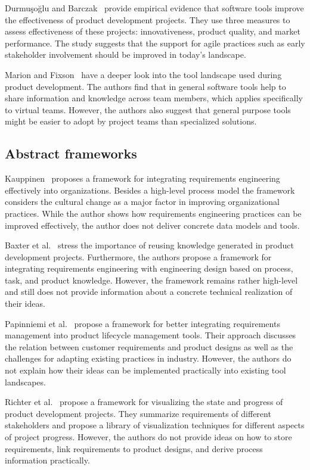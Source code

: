     Durmuşoğlu and Barczak~\cite{DURMUSOGLU2011321} provide empirical evidence that software tools improve the effectiveness of product development projects.
    They use three measures to assess effectiveness of these projects: innovativeness, product quality, and market performance.
    The study suggests that the support for agile practices such as early stakeholder involvement should be improved in today's landscape.
    
    Marion and Fixson~\cite{marion_fixson_2019} have a deeper look into the tool landscape used during product development.
    The authors find that in general software tools help to share information and knowledge across team members, which applies specifically to virtual teams.
    However, the authors also suggest that general purpose tools might be easier to adopt by project teams than specialized solutions.
    
    \subsection*{Abstract frameworks}
    Kauppinen~\cite{Kauppinen2005} proposes a framework for integrating requirements engineering effectively into organizations.
    Besides a high-level process model the framework considers the cultural change as a major factor in improving organizational practices.
    While the author shows how requirements engineering practices can be improved effectively, the author does not deliver concrete data models and tools.
    
    Baxter et al.~\cite{BAXTER2008585} stress the importance of reusing knowledge generated in product development projects.
    Furthermore, the authors propose a framework for integrating requirements engineering with engineering design based on process, task, and product knowledge.
    However, the framework remains rather high-level and still does not provide information about a concrete technical realization of their ideas.

    Papinniemi et al.~\cite{Jorma2014} propose a framework for better integrating requirements management into product lifecycle management tools.
    Their approach discusses the relation between customer requirements and product designs as well as the challenges for adapting existing practices in industry.
    However, the authors do not explain how their ideas can be implemented practically into existing tool landscapes.

    Richter et al.~\cite{RICHTER2020271} propose a framework for visualizing the state and progress of product development projects.
    They summarize requirements of different stakeholders and propose a library of visualization techniques for different aspects of project progress.
    However, the authors do not provide ideas on how to store requirements, link requirements to product designs, and derive process information practically.

